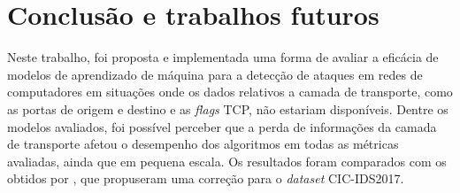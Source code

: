 \documentclass[12pt]{article}
\begin{document}





\section{Conclusão e trabalhos futuros}
\label{cap:conclusao}

Neste trabalho, foi proposta e implementada uma forma de avaliar a eficácia de modelos de aprendizado de máquina para a detecção de ataques em redes de computadores em situações onde os dados relativos a camada de transporte, como as portas de origem e destino e as \emph{flags} TCP, não estariam disponíveis. Dentre os modelos avaliados, foi possível perceber que a perda de informações da camada de transporte afetou o desempenho dos algoritmos em todas as métricas avaliadas, ainda que em pequena escala. Os resultados foram comparados com os obtidos por \cite{rosay2021cic}, que propuseram uma correção para o \emph{dataset} CIC-IDS2017.
\end{document}
